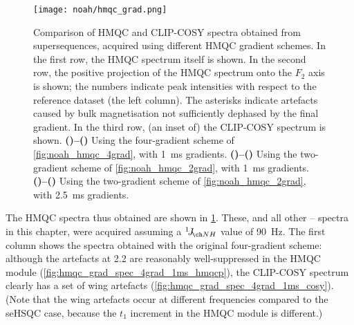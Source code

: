 \begin{figure}[!htbp]
    \centering
    \texttt{[image: noah/hmqc\_grad.png]}%
    {\label{fig:hmqc_grad_spec_4grad_1ms_hmqc}}%
    {\label{fig:hmqc_grad_spec_4grad_1ms_hmqcp}}%
    {\label{fig:hmqc_grad_spec_4grad_1ms_cosy}}%
    {\label{fig:hmqc_grad_spec_2grad_1ms_hmqc}}%
    {\label{fig:hmqc_grad_spec_2grad_1ms_hmqcp}}%
    {\label{fig:hmqc_grad_spec_2grad_1ms_cosy}}%
    {\label{fig:hmqc_grad_spec_2grad_2p5ms_hmqc}}%
    {\label{fig:hmqc_grad_spec_2grad_2p5ms_hmqcp}}%
    {\label{fig:hmqc_grad_spec_2grad_2p5ms_cosy}}%
    \caption[Comparison of  modules with different HMQC gradient schemes]{
        Comparison of HMQC and CLIP-COSY spectra obtained from  supersequences, acquired using different HMQC gradient schemes.
        In the first row, the HMQC spectrum itself is shown.
        In the second row, the positive projection of the HMQC spectrum onto the $F_2$ axis is shown; the numbers indicate peak intensities with respect to the reference dataset (the left column).
        The asterisks indicate artefacts caused by bulk magnetisation not sufficiently dephased by the final gradient.
        In the third row, (an inset of) the CLIP-COSY spectrum is shown.
        \textbf{()--()} Using the four-gradient scheme of \cref{fig:noah_hmqc_4grad}, with \qty{1}{ms} gradients.
        \textbf{()--()} Using the two-gradient scheme of \cref{fig:noah_hmqc_2grad}, with \qty{1}{ms} gradients.
        \textbf{()--()} Using the two-gradient scheme of \cref{fig:noah_hmqc_2grad}, with \qty{2.5}{ms} gradients.
    }
    \label{fig:hmqc_grad_spec}
\end{figure}

The HMQC spectra thus obtained are shown in \cref{fig:hmqc_grad_spec}.
These, and all other \proton{}--\nitrogen{} spectra in this chapter, were acquired assuming a $\oneJ{NH}$ value of \qty{90}{\Hz}.
The first column shows the spectra obtained with the original four-gradient scheme: although the artefacts at \qty{2.2}{\ppm} are reasonably well-suppressed in the HMQC module (\cref{fig:hmqc_grad_spec_4grad_1ms_hmqcp}), the CLIP-COSY spectrum clearly has a set of wing artefacts (\cref{fig:hmqc_grad_spec_4grad_1ms_cosy}).
(Note that the wing artefacts occur at different frequencies compared to the \carbon{} seHSQC case, because the $t_1$ increment in the \nitrogen{} HMQC module is different.)

